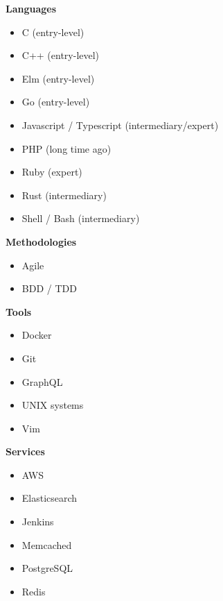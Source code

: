 \documentclass[9pt]{developercv} %
\begin{document}


\begin{minipage}[t]{0.3\textwidth} %
  \vspace{-\baselineskip}

  \textbf{Languages}
  \begin{itemize}
      \item C {\footnotesize (entry-level)}
      \item C++ {\footnotesize (entry-level)}
      \item Elm {\footnotesize (entry-level)}
      \item Go {\footnotesize (entry-level)}
      \item Javascript / Typescript {\footnotesize (intermediary/expert)}
      \item PHP {\footnotesize (long time ago)}
      \item Ruby {\footnotesize (expert)}
      \item Rust {\footnotesize (intermediary)}
      \item Shell / Bash {\footnotesize (intermediary)}
  \end{itemize}
\end{minipage}
\hfill
\begin{minipage}[t]{0.3\textwidth}
  \vspace{-\baselineskip}

  \textbf{Methodologies}
  \begin{itemize}
      \item Agile
      \item BDD / TDD
  \end{itemize}

  \textbf{Tools}
  \begin{itemize}
      \item Docker
      \item Git
      \item GraphQL
      \item UNIX systems
      \item Vim
  \end{itemize}
\end{minipage}
\hfill
\begin{minipage}[t]{0.3\textwidth}
  \vspace{-\baselineskip}

  \textbf{Services}
  \begin{itemize}
      \item AWS
      \item Elasticsearch
      \item Jenkins
      \item Memcached
      \item PostgreSQL
      \item Redis
  \end{itemize}
\end{minipage}

\end{document}
